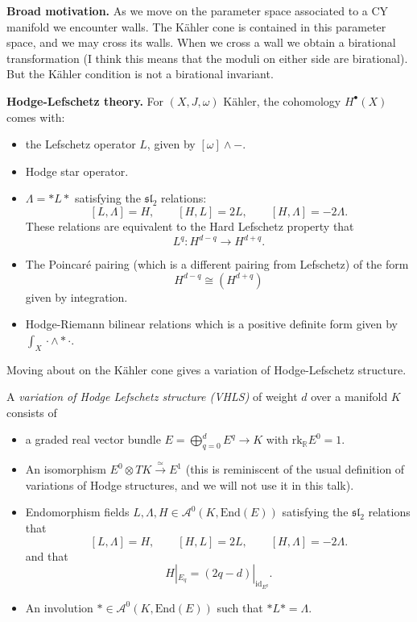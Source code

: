 {\medskip\noindent
{\bf Broad motivation.}
As we move on the parameter space associated
to a CY manifold we encounter walls.
The Kähler cone is contained in this
parameter space, and we may cross 
its walls. When we cross a wall
we obtain a birational transformation
(I think this means that the moduli
on either side are birational).
But the Kähler condition is not a 
birational invariant.

\medskip\noindent
{\bf Hodge-Lefschetz theory.}
For $(X,J,\omega)$ Kähler,
the cohomology $H^{\bullet}(X)$ comes with:
\begin{itemize}
\item the Lefschetz operator $L$,
given by $[\omega]\wedge-$.

\item Hodge star operator.
\item $\Lambda=* L *$ satisfying
the $\mathfrak{sl}_2$ relations:
$$
[L,\Lambda]=H,\qquad [H,L]=2L,\qquad [H,\Lambda]=-2\Lambda.
$$
These relations are equivalent to 
the Hard Lefschetz property that
$$
L^q:H^{d-q} \to H^{d+q}.
$$
\item The Poincaré pairing
(which is a different pairing from Lefschetz)
of the form
$$
H^{d-q}\cong (H^{d+q})
$$
given by integration.

\item Hodge-Riemann bilinear relations
which is a positive definite form given by
$\int_X\cdot \wedge *\cdot$.

\end{itemize}

\noindent
Moving about on the Kähler cone gives 
a variation of Hodge-Lefschetz structure.

\begin{definition}
\label{definition-variation-of-hodge-lefschetz-structure}
A {\it variation of Hodge Lefschetz structure (VHLS)} 
of weight $d$ over a manifold $K$ consists of
\begin{itemize}
\item a graded real vector bundle
$E=\bigoplus_{q=0}^d E^q \to K$
with $\text{rk}_\mathbb{R}E^0=1$.

\item An isomorphism $E^0 \otimes TK \xrightarrow{\simeq}E^1$
(this is reminiscent of the usual definition
of variations of Hodge structures, and 
we will not use it in this talk).

\item Endomorphism fields
$L, \Lambda,H \in \mathcal{A}^0(K,\text{End}(E))$
satisfying the $\mathfrak{sl}_2$ relations
that
$$
[L,\Lambda]=H,\qquad [H,L]=2L,\qquad [H,\Lambda]=-2\Lambda.
$$
and that
$$
H|_{E_q}=(2q-d)|_{\text{id}_{E^q}}.
$$
\item An involution $* \in \mathcal{A}^0(K,\text{End}(E))$
such that $* L *=\Lambda$.


\end{itemize}
\end{definition}}

